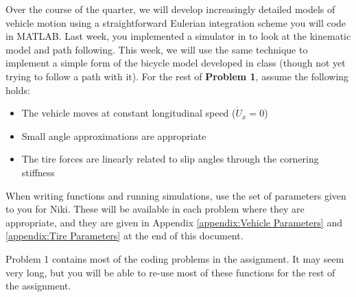 
Over the course of the quarter, we will develop increasingly detailed models of vehicle motion using a straightforward Eulerian integration scheme you will code in MATLAB.  
Last week, you implemented a simulator in \GRno{} to look at the kinematic model and path following. 
This week, we will use the same technique to implement a simple form of the bicycle model developed in class (though not
yet trying to follow a path with it). For the rest of \textbf{Problem 1}, assume the following holds:

\begin{itemize}
    \item The vehicle moves at constant longitudinal speed ($\dot{U}_x = 0$)
    \item Small angle approximations are appropriate
    \item The tire forces are linearly related to slip angles through the cornering stiffness
\end{itemize}

When writing functions and running simulations, use the set of parameters given to you for Niki. These will be available
in each \GRno{} problem where they are appropriate, and they are given in Appendix \ref{appendix:Vehicle Parameters} and
\ref{appendix:Tire Parameters} at the end of this document.

Problem 1 contains most of the coding problems in the assignment. It may seem very long, but you will be able to re-use
most of these functions for the rest of the assignment.

\vspace*{0.5cm}

